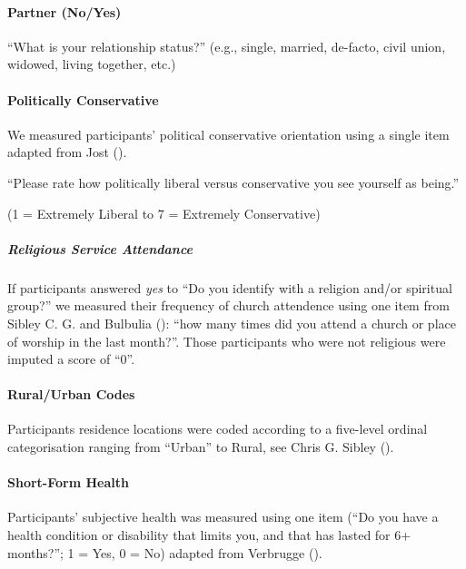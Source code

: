 \documentclass[
  single column]{article}
\let\oldparagraph\paragraph
\renewcommand{\paragraph}[1]{\oldparagraph{#1}\mbox{}}
\let\oldsubparagraph\subparagraph
\renewcommand{\subparagraph}[1]{\oldsubparagraph{#1}\mbox{}}
\begin{document}
\paragraph{Partner (No/Yes)}\label{partner-noyes}

``What is your relationship status?'' (e.g., single, married, de-facto,
civil union, widowed, living together, etc.)

\paragraph{Politically Conservative}\label{politically-conservative}

We measured participants' political conservative orientation using a
single item adapted from Jost ().

``Please rate how politically liberal versus conservative you see
yourself as being.''

(1 = Extremely Liberal to 7 = Extremely Conservative)

\subparagraph{Religious Service
Attendance}\label{religious-service-attendance}

If participants answered \emph{yes} to ``Do you identify with a religion
and/or spiritual group?'' we measured their frequency of church
attendence using one item from Sibley C. G. and Bulbulia
(): ``how many times did you attend a
church or place of worship in the last month?''. Those participants who
were not religious were imputed a score of ``0''.

\paragraph{Rural/Urban Codes}\label{ruralurban-codes}

Participants residence locations were coded according to a five-level
ordinal categorisation ranging from ``Urban'' to Rural, see Chris G.
Sibley ().

\paragraph{Short-Form Health}\label{short-form-health}

Participants' subjective health was measured using one item (``Do you
have a health condition or disability that limits you, and that has
lasted for 6+ months?''; 1 = Yes, 0 = No) adapted from Verbrugge
().
\end{document}
